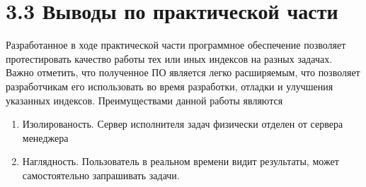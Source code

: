 \section{3.3 Выводы по практической части}
Разработанное в ходе практической части программное обеспечение позволяет протестировать качество работы тех или иных индексов на разных задачах. Важно отметить, что полученное ПО является легко расширяемым, что позволяет разработчикам его использовать во время разработки, отладки и улучшения указанных индексов.
Преимуществами данной работы являются
\begin{enumerate}
    \item Изолированость. Сервер исполнителя задач физически отделен от сервера менеджера
    \item Наглядность. Пользователь в реальном времени видит результаты, может самостоятельно запрашивать задачи. 
\end{enumerate}